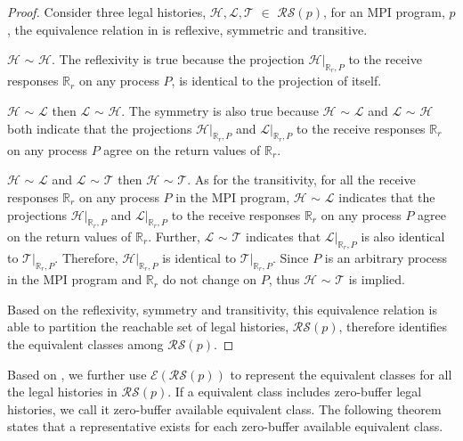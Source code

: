 \begin{proof}
Consider three legal histories, $\mathcal{H}, \mathcal{L}, \mathcal{T}$ $\in$ $\mathcal{RS}(\mathit{p})$, for an MPI program, $\mathit{p}$, the equivalence relation in  is reflexive, symmetric and transitive. 
\begin{compactenum}
\item $\mathcal{H}$ $\sim$ $\mathcal{H}$. The reflexivity is true because the projection $\mathcal{H} | _{\mathbb{R}_r,P}$ to the receive responses $\mathbb{R}_r$ on any process $P$, is identical to the projection of itself.
\item $\mathcal{H}$ $\sim$ $\mathcal{L}$ then $\mathcal{L}$ $\sim$ $\mathcal{H}$. The symmetry is also true because $\mathcal{H}$ $\sim$ $\mathcal{L}$ and $\mathcal{L}$ $\sim$ $\mathcal{H}$ both indicate that the projections $\mathcal{H} | _{\mathbb{R}_r,P}$ and $\mathcal{L} | _{\mathbb{R}_r,P}$ to the receive responses $\mathbb{R}_r$ on any process $P$ agree on the return values of $\mathbb{R}_r$. 
\item $\mathcal{H}$ $\sim$ $\mathcal{L}$ and $\mathcal{L}$ $\sim$ $\mathcal{T}$ then $\mathcal{H}$ $\sim$ $\mathcal{T}$. As for the transitivity, for all the receive responses $\mathbb{R}_r$ on any process $P$ in the MPI program, $\mathcal{H}$ $\sim$ $\mathcal{L}$ indicates that the projections $\mathcal{H} | _{\mathbb{R}_r,P}$ and $\mathcal{L} | _{\mathbb{R}_r,P}$ to the receive responses $\mathbb{R}_r$ on any process $P$ agree on the return values of $\mathbb{R}_r$. Further, $\mathcal{L}$ $\sim$ $\mathcal{T}$ indicates that $\mathcal{L} | _{\mathbb{R}_r,P}$ is also identical to $\mathcal{T} | _{\mathbb{R}_r,P}$. Therefore, $\mathcal{H} | _{\mathbb{R}_r,P}$ is identical to $\mathcal{T} | _{\mathbb{R}_r,P}$. Since $P$ is an arbitrary process in the MPI program and $\mathbb{R}_r$ do not change on $P$, thus $\mathcal{H}$ $\sim$ $\mathcal{T}$ is implied.
\end{compactenum}
Based on the reflexivity, symmetry and transitivity, this equivalence relation is able to partition the reachable set of legal histories, $\mathcal{RS}(\mathit{p})$, therefore identifies the equivalent classes among $\mathcal{RS}(\mathit{p})$.
\end{proof}

Based on , we further use $\mathcal{E}$$(\mathcal{RS}(\mathit{p}))$ to represent the equivalent classes for all the legal histories in $\mathcal{RS}(\mathit{p})$. If a equivalent class includes zero-buffer legal histories, we call it zero-buffer available equivalent class. The following theorem states that a representative exists for each zero-buffer available equivalent class. 

